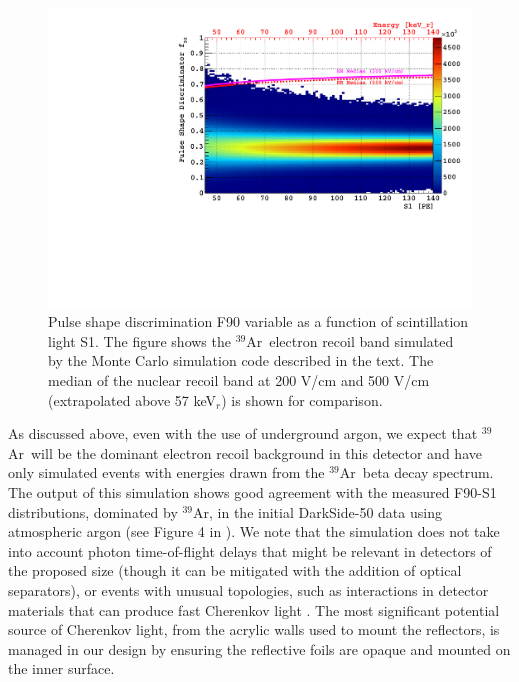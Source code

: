 \documentclass[a4paper,11pt]{article}
\newcommand{\artn}{$^{39}$Ar}
\begin{document}
\begin{figure}[ht]
\begin{centering}
\includegraphics[width=0.90\columnwidth]{Figures/f90_s1_3000ty_1pe.pdf}
\par\end{centering}
\caption{Pulse shape discrimination F90 variable as a function of scintillation light S1. The figure shows the \artn~electron recoil band simulated by the Monte Carlo simulation code described in the text. The median of the nuclear recoil band at 200 V/cm and 500 V/cm (extrapolated above 57 keV$_r$) is shown for comparison.  \label{fig:fnt_sim}}
\end{figure}

As discussed above, even with the use of underground argon, we expect that \artn~will be the dominant electron recoil background in this detector and have only simulated events with energies drawn from the \artn~beta decay spectrum. The output of this simulation shows good agreement with the measured F90-S1 distributions, dominated by \artn, in the initial DarkSide-50 data using atmospheric argon (see Figure 4 in \cite{agnes2015first}). We note that the simulation does not take into account photon time-of-flight delays that might be relevant in detectors of the proposed size (though it can be mitigated with the addition of optical separators), or events with unusual topologies, such as interactions in detector materials that can produce fast Cherenkov light \cite{agnes2018darkside, koh2018dark}. The most significant potential source of Cherenkov light, from the acrylic walls used to mount the reflectors, is managed in our design by ensuring the reflective foils are opaque and mounted on the inner surface.
\end{document}
